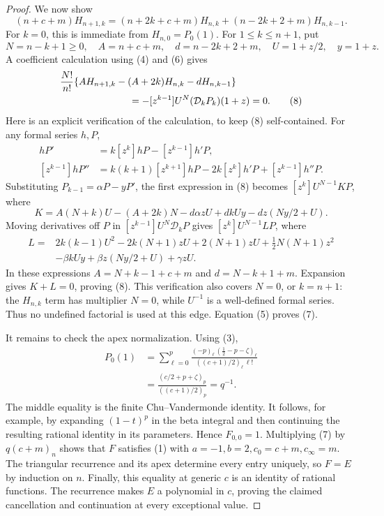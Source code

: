\documentclass[10pt]{article}
\newcommand{\rise}[2]{(#1)_{#2}}
\begin{document}
\begin{proof}
We now show
\[
 (n+c+m)H_{n+1,k}
 =(n+2k+c+m)H_{n,k}+(n-2k+2+m)H_{n,k-1}.
 \tag{7}
\]
For \(k=0\), this is immediate from \(H_{n,0}=P_0(1)\).
For \(1\le k\le n+1\), put
\[
 N=n-k+1\ge0,\quad A=n+c+m,\quad d=n-2k+2+m,\quad
 U=1+z/2,\quad y=1+z .
\]
A coefficient calculation using (4) and (6) gives
\begin{align}
 &\frac{N!}{n!}
 \{A H_{n+1,k}-(A+2k)H_{n,k}-dH_{n,k-1}\}\notag\\
 &\hspace{25mm}=-[z^{k-1}]U^N(\mathcal D_kP_k)(1+z)=0.       \tag{8}
\end{align}
Here is an explicit verification of the calculation, to keep (8) self-contained.
For any formal series \(h,P\),
\begin{align*}
 [z^{k-1}]hP'&=k[z^k]hP-[z^{k-1}]h'P,\\
 [z^{k-1}]hP''&=k(k+1)[z^{k+1}]hP
                    -2k[z^k]h'P+[z^{k-1}]h''P.
\end{align*}
Substituting \(P_{k-1}=\alpha P-yP'\), the first expression
in (8) becomes \([z^k]U^{N-1}KP\), where
\[
 K=A(N+k)U-(A+2k)N-d\alpha zU+dkUy-dz(Ny/2+U).
\]
Moving derivatives off \(P\) in \([z^{k-1}]U^N\mathcal D_kP\)
gives \([z^k]U^{N-1}LP\), where
\begin{align*}
 L={}&2k(k-1)U^2-2k(N+1)zU+2(N+1)zU
          +\tfrac12N(N+1)z^2\\
    &-\beta kUy+\beta z(Ny/2+U)+\gamma zU.
\end{align*}
In these expressions \(A=N+k-1+c+m\) and \(d=N-k+1+m\).
Expansion gives \(K+L=0\), proving (8).
This verification also covers \(N=0\), or \(k=n+1\):
the \(H_{n,k}\) term has multiplier \(N=0\), while \(U^{-1}\)
is a well-defined formal series. Thus no undefined factorial is used
at this edge. Equation (5) proves (7).

It remains to check the apex normalization. Using (3),
\begin{align*}
 P_0(1)
 &=\sum_{\ell=0}^p
   \frac{\rise{-p}\ell\,\rise{\frac12-p-\zeta}\ell}
        {\rise{(c+1)/2}\ell\,\ell!}\\
 &=\frac{\rise{c/2+p+\zeta}p}{\rise{(c+1)/2}p}
 =q^{-1}.                                                   \tag{9}
\end{align*}
The middle equality is the finite Chu--Vandermonde identity.
It follows, for example, by expanding \((1-t)^p\) in the beta
integral and then continuing the resulting rational identity in
its parameters. Hence \(F_{0,0}=1\).
Multiplying (7) by \(q\rise{c+m}n\) shows that \(F\) satisfies (1)
with \(a=-1,b=2,c_0=c+m,c_\infty=m\).
The triangular recurrence and its apex determine every entry uniquely,
so \(F=E\) by induction on \(n\).
Finally, this equality at generic \(c\) is an identity of rational
functions. The recurrence makes \(E\) a polynomial in \(c\), proving
the claimed cancellation and continuation at every exceptional value.
\end{proof}
\end{document}
